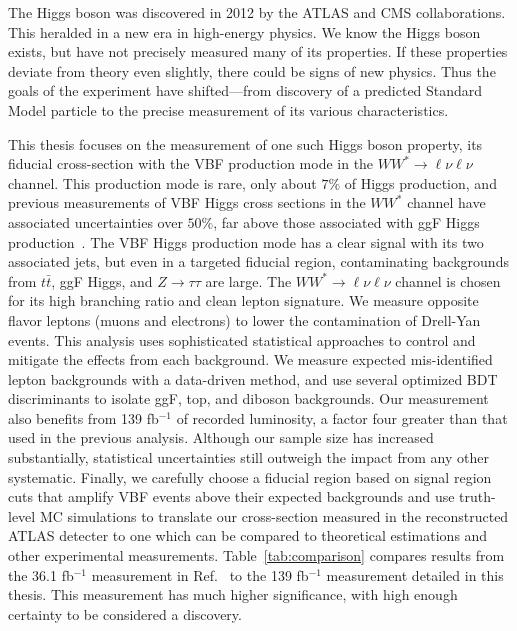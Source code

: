 The Higgs boson was discovered in 2012 by the ATLAS and CMS collaborations. This heralded in a new era in high-energy physics. We know the Higgs boson exists, but have not precisely measured many of its properties. If these properties deviate from theory even slightly, there could be signs of new physics. Thus the goals of the experiment have shifted---from discovery of a predicted Standard Model particle to the precise measurement of its various characteristics. 

This thesis focuses on the measurement of one such Higgs boson property, its fiducial cross-section with the VBF production mode in the $WW^*\rightarrow\ell\nu\ell\nu$ channel. This production mode is rare, only about $7\%$ of Higgs production, and previous measurements of VBF Higgs cross sections in the $WW^*$ channel have associated uncertainties over $50\%$, far above those associated with ggF Higgs production~\cite{HWW2016}. The VBF Higgs production mode has a clear signal with its two associated jets, but even in a targeted fiducial region, contaminating backgrounds from $t\bar{t}$, ggF Higgs, and $Z\rightarrow\tau\tau$ are large. The $WW^*\rightarrow \ell\nu\ell\nu$ channel is chosen for its high branching ratio and clean lepton signature. We measure opposite flavor leptons (muons and electrons) to lower the contamination of Drell-Yan events. This analysis uses sophisticated statistical approaches to control and mitigate the effects from each background. We measure expected mis-identified lepton backgrounds with a data-driven method, and use several optimized BDT discriminants to isolate ggF, top, and diboson backgrounds. Our measurement also benefits from 139 fb$^{-1}$ of recorded luminosity, a factor four greater than that used in the previous analysis. Although our sample size has increased substantially, statistical uncertainties still outweigh the impact from any other systematic. Finally, we carefully choose a fiducial region based on signal region cuts that amplify VBF events above their expected backgrounds and use truth-level MC simulations to translate our cross-section measured in the reconstructed ATLAS detecter to one which can be compared to theoretical estimations and other experimental measurements. Table~\ref{tab:comparison} compares results from the 36.1 fb$^{-1}$ measurement in Ref.~\cite{HWW2016} to the 139 fb$^{-1}$ measurement detailed in this thesis. This measurement has much higher significance, with high enough certainty to be considered a discovery. 

